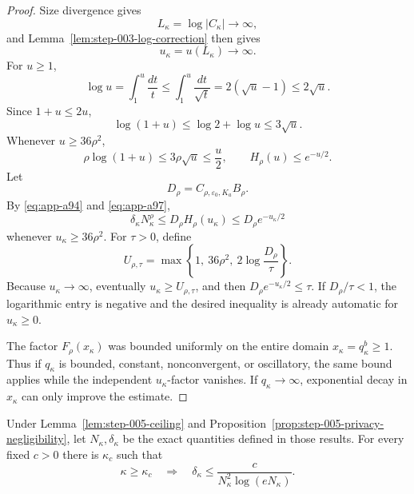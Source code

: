 \begin{proof}
Size divergence gives
\begin{equation}
L_\kappa=\log|C_\kappa|\longrightarrow\infty,
\label{eq:app-a102}
\end{equation}
and Lemma~\ref{lem:step-003-log-correction} then gives
\begin{equation}
u_\kappa=u(L_\kappa)\longrightarrow\infty.
\label{eq:app-a103}
\end{equation}
For \(u\geq1\),
\[
\log u
=\int_1^u\frac{dt}{t}
\leq\int_1^u\frac{dt}{\sqrt t}
=2(\sqrt u-1)
\leq2\sqrt u.
\]
Since \(1+u\leq2u\),
\begin{equation}
\log(1+u)\leq\log2+\log u\leq3\sqrt u.
\label{eq:app-a104}
\end{equation}
Whenever \(u\geq36\rho^2\),
\begin{equation}
\rho\log(1+u)
\leq3\rho\sqrt u
\leq\frac{u}{2},
\qquad
H_\rho(u)\leq e^{-u/2}.
\label{eq:app-a105}
\end{equation}
Let
\[
D_\rho=C_{\rho,\varepsilon_0,K_a}B_\rho.
\]
By \eqref{eq:app-a94} and \eqref{eq:app-a97},
\begin{equation}
\delta_\kappa N_\kappa^\rho
\leq D_\rho H_\rho(u_\kappa)
\leq D_\rho e^{-u_\kappa/2}
\label{eq:app-a106}
\end{equation}
whenever \(u_\kappa\geq36\rho^2\).
For \(\tau>0\), define
\begin{equation}
U_{\rho,\tau}
=\max\left\{
1,\ 36\rho^2,\ 2\log\frac{D_\rho}{\tau}
\right\}.
\label{eq:app-a107}
\end{equation}
Because \(u_\kappa\to\infty\), eventually
\(u_\kappa\geq U_{\rho,\tau}\), and then
\(D_\rho e^{-u_\kappa/2}\leq\tau\).  If
\(D_\rho/\tau<1\), the logarithmic entry is negative and the desired
inequality is already automatic for \(u_\kappa\geq0\).

The factor \(F_\rho(x_\kappa)\) was bounded uniformly on the entire
domain \(x_\kappa=q_\kappa^b\geq1\).  Thus if \(q_\kappa\) is bounded,
constant, nonconvergent, or oscillatory, the same bound applies while
the independent \(u_\kappa\)-factor vanishes.  If
\(q_\kappa\to\infty\), exponential decay in \(x_\kappa\) can only
improve the estimate.
\end{proof}

\begin{proposition}
\label{prop:step-005-source-allowance}
Under Lemma~\ref{lem:step-005-ceiling} and
Proposition~\ref{prop:step-005-privacy-negligibility}, let
\(N_\kappa,\delta_\kappa\) be the exact quantities defined in those
results.  For every fixed \(c>0\) there is \(\kappa_c\) such that
\begin{equation}
\kappa\geq\kappa_c
\quad\Longrightarrow\quad
\delta_\kappa
\leq
\frac{c}{N_\kappa^2\log(eN_\kappa)}.
\label{eq:app-a108}
\end{equation}
\end{proposition}

